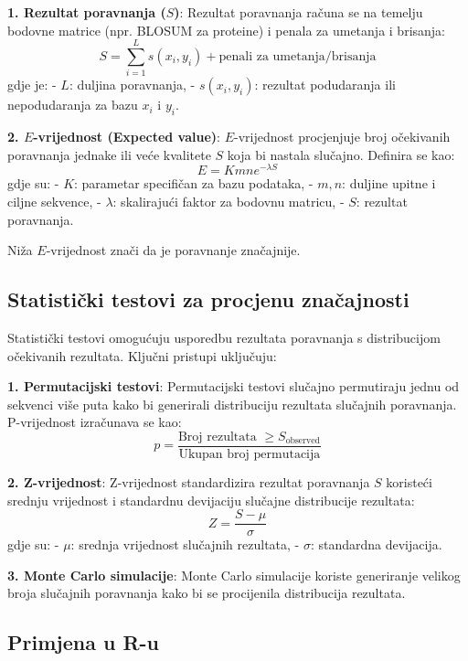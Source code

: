 \documentclass[10pt,a4paper,twoside]{article}
\begin{document}
\textbf{1. Rezultat poravnanja (\( S \))}:  
Rezultat poravnanja računa se na temelju bodovne matrice (npr. BLOSUM za proteine) i penala za umetanja i brisanja:
\[
S = \sum_{i=1}^L s(x_i, y_i) + \text{penali za umetanja/brisanja}
\]
gdje je:
- \( L \): duljina poravnanja,
- \( s(x_i, y_i) \): rezultat podudaranja ili nepodudaranja za bazu \( x_i \) i \( y_i \).

\textbf{2. \( E \)-vrijednost (Expected value)}:  
\( E \)-vrijednost procjenjuje broj očekivanih poravnanja jednake ili veće kvalitete \( S \) koja bi nastala slučajno. Definira se kao:
\[
E = Kmne^{-\lambda S}
\]
gdje su:
- \( K \): parametar specifičan za bazu podataka,
- \( m, n \): duljine upitne i ciljne sekvence,
- \( \lambda \): skalirajući faktor za bodovnu matricu,
- \( S \): rezultat poravnanja.

Niža \( E \)-vrijednost znači da je poravnanje značajnije.

\subsection*{Statistički testovi za procjenu značajnosti}

Statistički testovi omogućuju usporedbu rezultata poravnanja s distribucijom očekivanih rezultata. Ključni pristupi uključuju:

\textbf{1. Permutacijski testovi}:  
Permutacijski testovi slučajno permutiraju jednu od sekvenci više puta kako bi generirali distribuciju rezultata slučajnih poravnanja. P-vrijednost izračunava se kao:
\[
p = \frac{\text{Broj rezultata } \geq S_\text{observed}}{\text{Ukupan broj permutacija}}
\]

\textbf{2. Z-vrijednost}:  
Z-vrijednost standardizira rezultat poravnanja \( S \) koristeći srednju vrijednost i standardnu devijaciju slučajne distribucije rezultata:
\[
Z = \frac{S - \mu}{\sigma}
\]
gdje su:
- \( \mu \): srednja vrijednost slučajnih rezultata,
- \( \sigma \): standardna devijacija.

\textbf{3. Monte Carlo simulacije}:  
Monte Carlo simulacije koriste generiranje velikog broja slučajnih poravnanja kako bi se procijenila distribucija rezultata.

\subsection*{Primjena u R-u}
\end{document}
